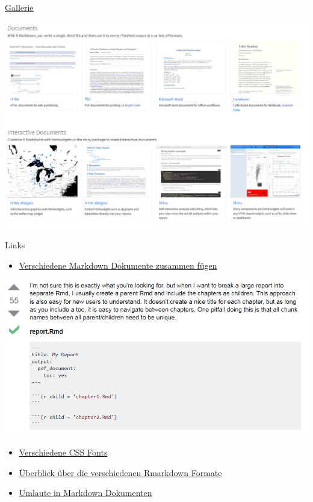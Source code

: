 \documentclass[ignorenonframetext,]{beamer}
\providecommand{\tightlist}{%
\setlength{\itemsep}{0pt}\setlength{\parskip}{0pt}}
\begin{document}
\begin{frame}{\href{http://rmarkdown.rstudio.com/gallery.html}{Gallerie}}

\includegraphics{./tex2pdf.956/b5dffb8ef7827951a1fe64eba6c0f919b6b0d353.png}

\end{frame}

\begin{frame}{Links}

\begin{itemize}
\tightlist
\item
  \href{http://stackoverflow.com/questions/25824795/how-to-combine-two-rmarkdown-rmd-files-into-a-single-output}{Verschiedene
  Markdown Dokumente zusammen fügen}
\end{itemize}

\includegraphics{./tex2pdf.956/d7a0873ade3c4cb8113d2ab3d45e0d3f5a39b1f1.png}

\begin{itemize}
\item
  \href{http://www.cssfontstack.com/}{Verschiedene CSS Fonts}
\item
  \href{http://rmarkdown.rstudio.com/formats.html}{Überblick über die
  verschiedenen Rmarkdown Formate}
\item
  \href{https://stackoverflow.com/questions/41567549/german-umlauts-in-r-markdown-again}{Umlaute
  in Markdown Dokumenten}
\end{itemize}

\end{frame}
\end{document}
